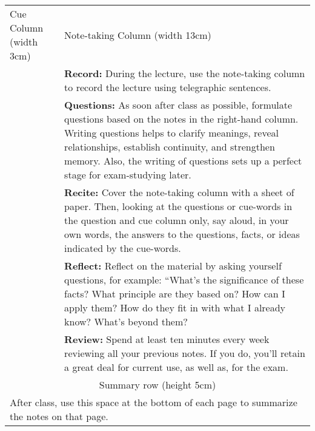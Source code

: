\begin{tabular}{|p{3cm}||p{13cm}|}
\hline
Cue Column (width 3cm) & Note-taking Column (width 13cm) \\
& \textbf{Record:} During the lecture, use the note-taking column to record the lecture using telegraphic sentences. \\
& \textbf{Questions:} As soon after class as possible, formulate questions based on the notes in the right-hand column. Writing questions helps to clarify meanings, reveal relationships, establish continuity, and strengthen memory. Also, the writing of questions sets up a perfect stage for exam-studying later. \\
& \textbf{Recite:} Cover the note-taking column with a sheet of paper. Then, looking at the questions or cue-words in the question and cue column only, say aloud, in your own words, the answers to the questions, facts, or ideas indicated by the cue-words. \\
& \textbf{Reflect:} Reflect on the material by asking yourself questions, for example: “What’s the significance of these facts? What principle are they based on? How can I apply them? How do they fit in with what I already know?  What’s beyond them? \\
& \textbf{Review:} Spend at least ten minutes every week reviewing all your previous notes. If you do, you’ll retain a great deal for current use, as well as, for the exam. \\
\hline \hline
\multicolumn{2}{|c|}{Summary row (height 5cm)} \\
\multicolumn{2}{|p{16cm}|}{After class, use this space at the bottom of each page to summarize the notes on that page.} \\
\hline
\end{tabular}

\newpage

